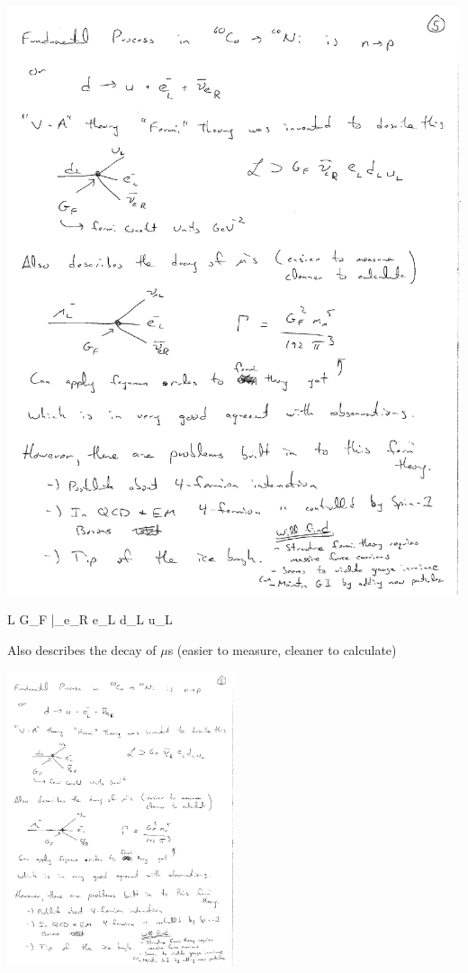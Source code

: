 {\begin{minipage}{0.6\textwidth}
\bc
\includegraphics[width=1.0\textwidth]{./BetaDecay.pdf}
\ec
\end{minipage} \hfill
\begin{minipage}{0.4\textwidth}
\be 
L \supset G_F \bar{\nu}_{e_R} e_L d_L u_L
\ee
\end{minipage} \hfill

Also describes the decay of $\mu$s (easier to measure, cleaner to calculate)

\bc
\includegraphics[width=0.5\textwidth]{./MuonDecay.pdf}
\ec

}
